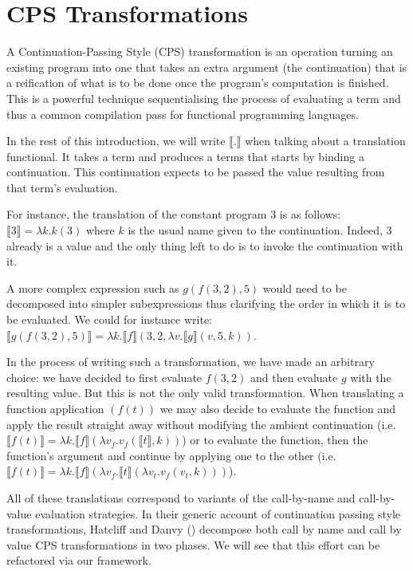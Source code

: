 \chapter{CPS Transformations}
\label{cps-transformation}

A Continuation-Passing Style (CPS) transformation is an operation
turning an existing program into one that takes an extra argument
(the continuation) that is a reification of what is to be done
once the program's computation is finished. This is a powerful
technique sequentialising the process of evaluating a term and
thus a common compilation pass for functional programming languages.

In the rest of this introduction, we will write $⟦.⟧$ when talking
about a translation functional. It takes a term and produces a terms
that starts by binding a continuation. This continuation expects to
be passed the value resulting from that term's evaluation.

For instance, the translation of the constant program $3$ is as follows:
{$⟦3⟧ = λk. k(3)$} where $k$ is the usual name given to the continuation.
Indeed, $3$ already is a value and the only thing left to do is to invoke
the continuation with it.

A more complex expression such as $g(f(3,2),5)$ would need to be decomposed
into simpler subexpressions thus clarifying the order in which it is to be
evaluated. We could for instance write:
{$⟦g(f(3,2),5)⟧ = λk. ⟦f⟧ (3,2,λv. ⟦g⟧ (v,5,k))$}.

In the process of writing such a transformation, we have made an arbitrary
choice: we have decided to first evaluate $f(3,2)$ and then evaluate $g$
with the resulting value. But this is not the only valid transformation.
When translating a function application $(f(t))$ we may also decide to
evaluate the function and apply the result straight away without modifying
the ambient continuation
%
(i.e. {$⟦f(t)⟧ = λk. ⟦f⟧ (λv_f. v_f(⟦t⟧,k))$})
%
or to evaluate the function, then the function's argument and continue by
applying one to the other
%
(i.e. {$⟦f(t)⟧ = λk. ⟦f⟧ (λv_f. ⟦t⟧ (λv_t. v_f(v_t,k)))$}).

All of these translations correspond to variants of the call-by-name
and call-by-value evaluation strategies. In their generic account of
continuation passing style transformations, Hatcliff and Danvy
(\citeyear{hatcliff1994generic}) decompose both call by name and call
by value CPS transformations in two phases. We will see that this
effort can be refactored via our  framework.

